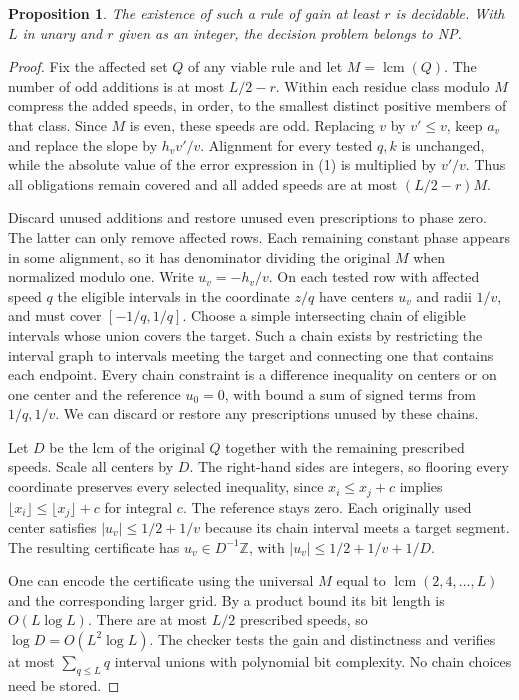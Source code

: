 \documentclass[11pt]{article}
\newtheorem{proposition}[theorem]{Proposition}
\theoremstyle{definition}
\newcommand{\Z}{\mathbb{Z}}
\DeclareMathOperator{\lcm}{lcm}
\begin{document}
\begin{proposition}\label{prop:np}
The existence of such a rule of gain at least \(r\) is decidable.
With \(L\) in unary and \(r\) given as an integer, the decision
problem belongs to NP.
\end{proposition}
\begin{proof}
Fix the affected set \(Q\) of any viable rule and let \(M=\lcm(Q)\).
The number of odd additions is at most \(L/2-r\).
Within each residue class modulo \(M\) compress the added speeds,
in order, to the smallest distinct positive members of that class.
Since \(M\) is even, these speeds are odd. Replacing \(v\) by \(v'\le v\),
keep \(a_v\) and replace the slope by \(h_vv'/v\).
Alignment for every tested \(q,k\) is unchanged, while the absolute
value of the error expression in (1) is multiplied by \(v'/v\).
Thus all obligations remain covered and all added speeds are at
most \((L/2-r)M\).

Discard unused additions and restore unused even prescriptions to
phase zero. The latter can only remove affected rows. Each remaining
constant phase appears in some alignment, so it has denominator
dividing the original \(M\) when normalized modulo one.
Write \(u_v=-h_v/v\). On each tested row with affected speed \(q\)
the eligible intervals in the coordinate \(z/q\) have centers \(u_v\)
and radii \(1/v\), and must cover \([-1/q,1/q]\).
Choose a simple intersecting chain of eligible intervals whose union
covers the target. Such a chain exists by restricting the interval
graph to intervals meeting the target and connecting one that contains
each endpoint. Every chain constraint is a difference inequality on
centers or on one center and the reference \(u_0=0\), with bound a sum
of signed terms from \(1/q,1/v\).
We can discard or restore any prescriptions unused by these chains.

Let \(D\) be the lcm of the original \(Q\) together with the remaining
prescribed speeds. Scale all centers by \(D\). The right-hand sides
are integers, so flooring every coordinate preserves every selected
inequality, since \(x_i\le x_j+c\) implies
\(\lfloor x_i\rfloor\le\lfloor x_j\rfloor+c\) for integral \(c\).
The reference stays zero. Each originally used center satisfies
\(|u_v|\le1/2+1/v\) because its chain interval meets a target segment.
The resulting certificate has \(u_v\in D^{-1}\Z\), with
\(|u_v|\le1/2+1/v+1/D\).

One can encode the certificate using the universal \(M\) equal to
\(\lcm(2,4,\ldots,L)\) and the corresponding larger grid.
By a product bound its bit length is \(O(L\log L)\).
There are at most \(L/2\) prescribed speeds, so
\(\log D=O(L^2\log L)\). The checker tests the gain and
distinctness and verifies at most \(\sum_{q\le L}q\) interval unions
with polynomial bit complexity. No chain choices need be stored.
\end{proof}
\end{document}
